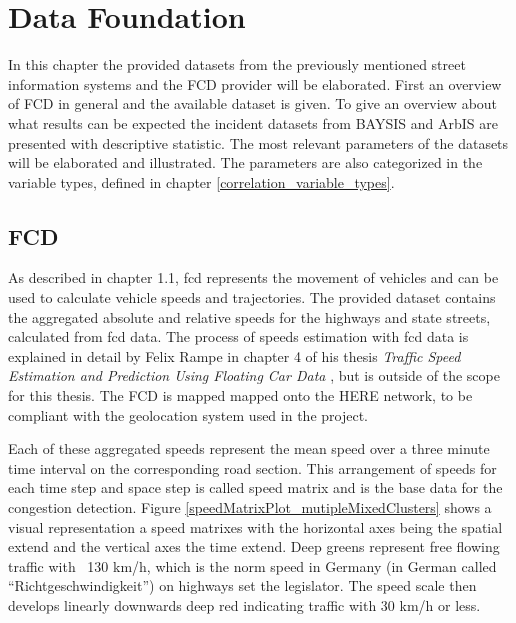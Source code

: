 \documentclass[a4paper,headsepline,footsepline,fontsize=11pt,BCOR=12mm,DIV=12]{report}
\begin{document}
\chapter{Data Foundation}
\label{data}
In this chapter the provided datasets from the previously mentioned street information systems and the FCD provider will be elaborated. First an overview of FCD in general and the available dataset is given. To give an overview about what results can be expected the incident datasets from BAYSIS and ArbIS are presented with descriptive statistic. The most relevant parameters of the datasets will be elaborated and illustrated. The parameters are also categorized in the variable types, defined in chapter \ref{correlation_variable_types}.

\section{FCD}
\label{dataset_fcd}
 
As described in chapter 1.1, \acrshort{fcd} represents the movement of vehicles and can be used to calculate vehicle speeds and trajectories. The provided dataset contains the aggregated absolute and relative speeds for the highways and state streets, calculated from \acrshort{fcd} data. The process of speeds estimation with \acrshort{fcd} data is explained in detail by Felix Rampe in chapter 4 of his thesis \textit{Traffic Speed Estimation and Prediction Using Floating Car Data} \cite{Rempe2018}, but is outside of the scope for this thesis. The FCD is mapped mapped onto the HERE \cite{HERE2020} network, to be compliant with the geolocation system used in the project.


Each of these aggregated speeds represent the mean speed over a three minute time interval on the corresponding road section. This arrangement of speeds for each time step and space step is called speed matrix and is the base data for the congestion detection. Figure \ref{speedMatrixPlot_mutipleMixedClusters} shows a visual representation a speed matrixes with the horizontal axes being the spatial extend and the vertical axes the time extend. Deep greens represent free flowing traffic with ~130 km/h, which is the norm speed in Germany (in German called “Richtgeschwindigkeit”) on highways set the legislator. The speed scale then develops linearly downwards deep red indicating traffic with 30 km/h or less. 
\end{document}
